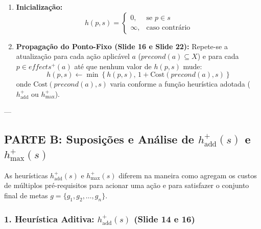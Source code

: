 \documentclass[a4paper,12pt]{article}
\begin{document}
\begin{enumerate}
	\item \textbf{Inicialização:}
	\begin{equation}
		h(p, s) = 
		\begin{cases}
			0, & \text{se } p \in s \\
			\infty, & \text{caso contrário}
		\end{cases}
	\end{equation}
	
	\item \textbf{Propagação do Ponto-Fixo (Slide 16 e Slide 22):}
	Repete-se a atualização para cada ação aplicável $a$ ($precond(a) \subseteq X$) e para cada $p \in effects^+(a)$ até que nenhum valor de $h(p, s)$ mude:
	\begin{equation}
		h(p, s) \leftarrow \min \left\{ h(p, s), \, 1 + \text{Cost}(precond(a), s) \right\}
	\end{equation}
	onde $\text{Cost}(precond(a), s)$ varia conforme a função heurística adotada ($h_{\text{add}}^+$ ou $h_{\text{max}}^+$).
\end{enumerate}

---

\subsection*{PARTE B: Suposições e Análise de $h_{\text{add}}^+(s)$ e $h_{\text{max}}^+(s)$}

As heurísticas $h_{\text{add}}^+(s)$ e $h_{\text{max}}^+(s)$ diferem na maneira como agregam os custos de múltiplos pré-requisitos para acionar uma ação e para satisfazer o conjunto final de metas $g = \{g_1, g_2, \dots, g_n\}$.

\subsubsection*{1. Heurística Aditiva: $h_{\text{add}}^+(s)$ (Slide 14 e 16)}
\end{document}
